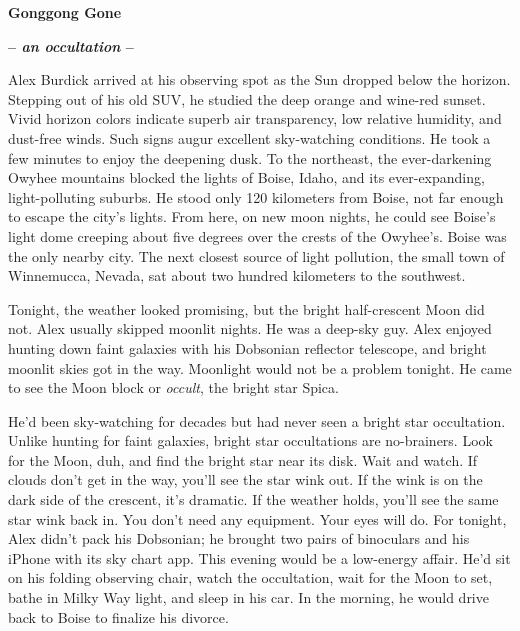 \begin{center}\Large\textbf{Gonggong Gone}\normalsize\end{center}

\begin{center}\large\textbf{-- \emph{an occultation} --}\normalsize\end{center}

Alex Burdick arrived at his observing spot as the Sun dropped below the
horizon. Stepping out of his old SUV, he studied the deep orange and
wine-red sunset. Vivid horizon colors indicate superb air transparency,
low relative humidity, and dust-free winds. Such signs augur excellent
sky-watching conditions. He took a few minutes to enjoy the deepening
dusk. To the northeast, the ever-darkening Owyhee mountains blocked the
lights of Boise, Idaho, and its ever-expanding, light-polluting suburbs.
He stood only 120 kilometers from Boise, not far enough to escape the
city's lights. From here, on new moon nights, he could see Boise's light
dome creeping about five degrees over the crests of the Owyhee's. Boise
was the only nearby city. The next closest source of light pollution,
the small town of Winnemucca, Nevada, sat about two hundred kilometers
to the southwest.

Tonight, the weather looked promising, but the bright half-crescent Moon
did not. Alex usually skipped moonlit nights. He was a deep-sky guy.
Alex enjoyed hunting down faint galaxies with his Dobsonian reflector
telescope, and bright moonlit skies got in the way. Moonlight would not
be a problem tonight. He came to see the Moon block or \emph{occult},
the bright star Spica.

He'd been sky-watching for decades but had never seen a bright star
occultation. Unlike hunting for faint galaxies, bright star occultations
are no-brainers. Look for the Moon, duh, and find the bright star near
its disk. Wait and watch. If clouds don't get in the way, you'll see the
star wink out. If the wink is on the dark side of the crescent, it's
dramatic. If the weather holds, you'll see the same star wink back in.
You don't need any equipment. Your eyes will do. For tonight, Alex
didn't pack his Dobsonian; he brought two pairs of binoculars and his
iPhone with its sky chart app. This evening would be a low-energy
affair. He'd sit on his folding observing chair, watch the occultation,
wait for the Moon to set, bathe in Milky Way light, and sleep in his
car. In the morning, he would drive back to Boise to finalize his
divorce.

